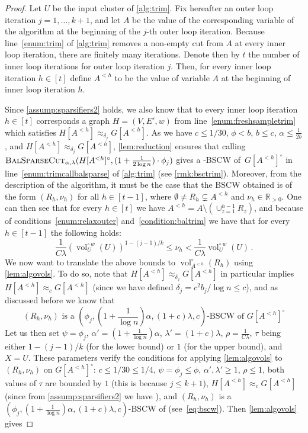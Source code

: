 \documentclass[epsfig,letter,11pt]{article}
\numberwithin{equation}{section}
\newcommand{\unvolc}[2]{\operatorname{vol}_{#2}^\circ (#1)}
\newcommand{\wvolc}[2]{\operatorname{vol}_{#2}^{\circ \,w} (#1)}
\newcommand{\bsc}{\textsc{BalSparseCut}_{\alpha,\lambda}}
\begin{document}
\begin{proof}
	Let $U$ be the input cluster of \cref{alg:trim}. Fix hereafter an outer loop iteration $j=1,\dots, k+1$, and let $A$ be the value of the corresponding variable of the algorithm at the beginning of the $j$-th outer loop iteration. Because line~\eqref{enum:trim} of \cref{alg:trim} removes a non-empty cut from $A$ at every inner loop iteration, there are finitely many iterations. Denote then by $t$ the number of inner loop iterations for outer loop iteration $j$. Then, for every  inner loop iteration $h\in [t]$ define $A^{<h}$ to be the value of variable $A$ at the beginning of inner loop iteration $h$.
	
	Since \cref{assump:sparsifiers2} holds,  we also know that to every inner loop iteration $h \in [t]$ corresponds a graph $H=(V,E',w)$ from line~\eqref{enum:freshsampletrim} which satisfies $H[A^{<h}] \approx_{\delta_j} G[A^{<h}]$. As we have $c \le 1/30$, $\phi < b$, $b \le c$, $\alpha \le \frac{1}{2b}$,  and $H[A^{<h}] \approx_{\delta_j} G[A^{<h}]$, \cref{lem:reduction} ensures that calling $\bsc(H[A^{<h}]^\circ, (1+\frac{1}{2\log n}) \cdot \phi_j)$ gives a -BSCW of~$G[A^{<h}]^\circ$ in line~\eqref{enum:trimcallbalsparse} of \cref{alg:trim} (see \cref{rmk:bsctrim}). Moreover, from the description of the algorithm, it must be the case that the BSCW obtained is of the form $(R_h,\nu_h)$ for all $h \in [t-1]$, where $\emptyset \neq R_h \subsetneq A^{<h}$ and $\nu_h \in \mathbb{R}_{> 0}$. One can then see that for every $h \in [t]$ we have $A^{<h}=A \setminus (\cup_{z=1}^{h-1}R_z)$, and because of conditions~\eqref{enum:relaxouter} and~\eqref{condition:baltrim} we have that for every $h \in [t-1]$ the following holds:
	\begin{equation*}
		\frac{1}{C\lambda}\left(\wvolc{U}{U}\right)^{1-(j-1)/k} \le \nu_h < \frac{1}{C\lambda}\wvolc{U}{U} \, .
	\end{equation*}
	We now want to translate the above bounds to $\unvolc{R_h}{A^{<h}}$ using \cref{lem:algovols}. To do so, note that $H[A^{<h}] \approx_{\delta_j} G[A^{<h}]$ in particular implies $H[A^{<h}] \approx_{c} G[A^{<h}]$ (since we have defined $\delta_j=c^2 b_j/\log n \le c$), and as discussed before we know that
	\begin{equation}
		\label{eq:bscw}
		\text{$(R_h,\nu_h)$ is a $\left(\phi_j,\left(1+\frac{1}{\log n}\right)\alpha,(1+c)\lambda,c\right)$-BSCW of~$G[A^{<h}]^\circ$}
	\end{equation}
	Let us then set $\psi=\phi_j$, $ \alpha'=(1+\frac{1}{\log n})\alpha$, $\lambda' =(1+c)\lambda$, $\rho = \frac{1}{C\lambda}$, $\tau$ being either $1-(j-1)/k$ (for the lower bound) or $1$ (for the upper bound), and $X=U$. These parameters verify the conditions for applying \cref{lem:algovols} to $(R_h,\nu_h)$ on $G[A^{<h}]^\circ$: $c \le 1/30 \le 1/4$, $\psi =\phi_j\le \phi$, $\alpha',\lambda' \ge 1$, $\rho \le 1$, both values of $\tau$ are bounded by $1$ (this is because $j \le k+1$), $H[A^{<h}] \approx_{c} G[A^{<h}]$ (since from \cref{assump:sparsifiers2} we have ), and $(R_h,\nu_h)$ is a $(\phi_j,(1+\frac{1}{\log n})\alpha,(1+c)\lambda,c)$-BSCW of  (see~\eqref{eq:bscw}). Then \cref{lem:algovols} gives

\end{proof}
\end{document}
